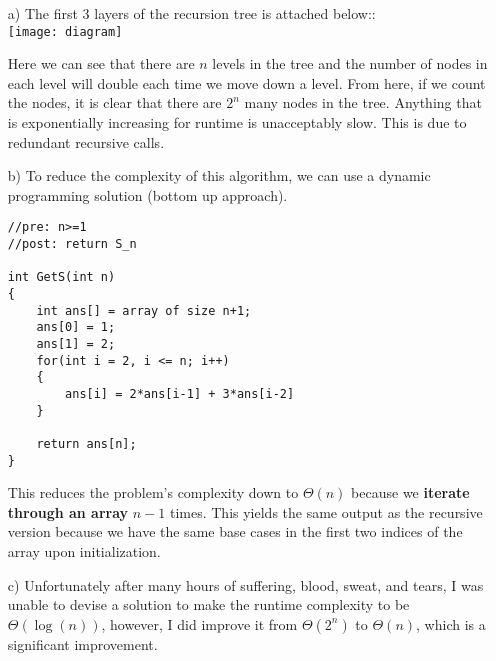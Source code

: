 \documentclass[12pt]{article}
\begin{document}
\begin{itemize}
    \item[a)] The first 3 layers of the recursion tree is attached below::\\
    
    \texttt{[image: diagram]}

    Here we can see that there are $n$ levels in the tree and the number of nodes in each level will double each time we move down a level. From here, if we count the nodes, it is clear that there are $2^n$ many nodes in the tree. Anything that is exponentially increasing for runtime is unacceptably slow. This is due to redundant recursive calls.

    \item[b)] To reduce the complexity of this algorithm, we can use a dynamic programming solution (bottom up approach).
    \begin{lstlisting}
//pre: n>=1
//post: return S_n

int GetS(int n)
{
    int ans[] = array of size n+1;
    ans[0] = 1;
    ans[1] = 2;
    for(int i = 2, i <= n; i++)
    {
        ans[i] = 2*ans[i-1] + 3*ans[i-2]
    }

    return ans[n];
}
    \end{lstlisting}

    This reduces the problem's complexity down to $\Theta(n)$ because we \textbf{iterate through an array} $n-1$ times. This yields the same output as the recursive version because we have the same base cases in the first two indices of the array upon initialization.

    \item[c)] Unfortunately after many hours of suffering, blood, sweat, and tears, I was unable to devise a solution to make the runtime complexity to be $\Theta(\log(n))$, however, I did improve it from $\Theta (2^n)$ to $\Theta (n)$, which is a significant improvement.
\end{itemize}
\end{document}
